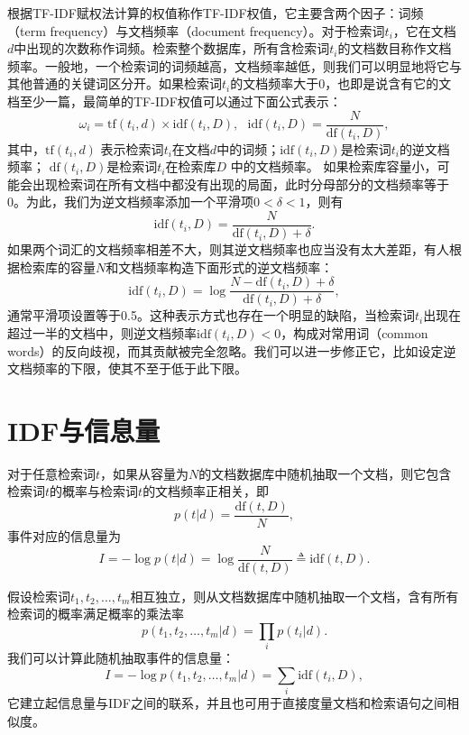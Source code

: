 根据TF-IDF赋权法计算的权值称作TF-IDF权值，它主要含两个因子：词频（term frequency）与文档频率（document frequency）。对于检索词$t_i$，它在文档$d$中出现的次数称作词频。检索整个数据库，所有含检索词$t_i$的文档数目称作文档频率。一般地，一个检索词的词频越高，文档频率越低，则我们可以明显地将它与其他普通的关键词区分开。如果检索词$t_i$的文档频率大于0，也即是说含有它的文档至少一篇，最简单的TF-IDF权值可以通过下面公式表示：
\begin{equation}\label{eq:tfidf}
    \omega_i = \textrm{tf}(t_i,d) \times \textrm{idf}(t_i,D),~~~\textrm{idf}(t_i,D) = \frac{N}{\textrm{df}(t_i,D)},
\end{equation}
其中，$\textrm{tf}(t_i,d)$
表示检索词$t_i$在文档$d$中的词频；$\textrm{idf}(t_i,D)$是检索词$t_i$的逆文档频率；
$\textrm{df}(t_i,D)$是检索词$t_i$在检索库$D$ 中的文档频率。
如果检索库容量小，可能会出现检索词在所有文档中都没有出现的局面，此时分母部分的文档频率等于0。为此，我们为逆文档频率添加一个平滑项$0 < \delta < 1$，则有
\[
    \textrm{idf}(t_i,D) = \frac{N}{\textrm{df}(t_i,D) + \delta}.
\]
如果两个词汇的文档频率相差不大，则其逆文档频率也应当没有太大差距，有人根据检索库的容量$N$和文档频率构造下面形式的逆文档频率：
\[
    \textrm{idf}(t_i,D) = \log \frac{N - \textrm{df}(t_i,D) + \delta}{\textrm{df}(t_i,D) + \delta},
\]
通常平滑项设置等于0.5。这种表示方式也存在一个明显的缺陷，当检索词$t_i$出现在超过一半的文档中，则逆文档频率$\textrm{idf}(t_i,D)<0$，构成对常用词（common words）的反向歧视，而其贡献被完全忽略。我们可以进一步修正它，比如设定逆文档频率的下限，使其不至于低于此下限。

\section{IDF与信息量}
对于任意检索词$t$，如果从容量为$N$的文档数据库中随机抽取一个文档，则它包含检索词$t$的概率与检索词$t$的文档频率正相关，即
\[
    p(t|d) = \frac{\textrm{df}(t,D)}{N},
\]
事件对应的信息量为
\[
    I = -\log p(t|d) = \log \frac{N}{\textrm{df}(t,D)} \triangleq \textrm{idf}(t,D).
\]

假设检索词$t_1,t_2,\ldots,t_m$相互独立，则从文档数据库中随机抽取一个文档，含有所有检索词的概率满足概率的乘法率
\[
    p(t_1, t_2, \ldots, t_m|d) = \prod\limits_i p(t_i|d).
\]
我们可以计算此随机抽取事件的信息量：
\[
    I = - \log p(t_1, t_2, \ldots, t_m|d) = \sum\limits_i \textrm{idf}(t_i,D),
\]
它建立起信息量与IDF之间的联系，并且也可用于直接度量文档和检索语句之间相似度。

